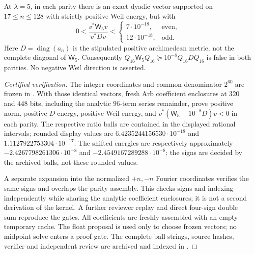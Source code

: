 \begin{proposition}
\label{prop:v152-tail-comparison}
At $\lambda=5$, in each parity there is an exact dyadic vector supported
on $17\le n\le128$ with strictly positive Weil energy, but with
\[
 0<\frac{v^*\mathsf W_5v}{v^*Dv}
 <\begin{cases}7\cdot10^{-18},&\text{even},\\
               12\cdot10^{-18},&\text{odd}.
   \end{cases}
\]
Here $D=\operatorname{diag}(a_n)$ is the stipulated positive
archimedean metric, not the complete diagonal of $\mathsf W_5$.
Consequently $Q_{16}\mathsf W_5Q_{16}\succeq10^{-8}Q_{16}DQ_{16}$
is false in both parities. No negative Weil direction is asserted.
\end{proposition}
\begin{proof}[Certified verification]
The integer coordinates and common denominator $2^{60}$ are frozen in
. With those identical
vectors, fresh Arb coefficient enclosures at $320$ and $448$ bits,
including the analytic $96$-term series remainder, prove positive norm,
positive $D$ energy, positive Weil energy, and
$v^*(\mathsf W_5-10^{-8}D)v<0$ in each parity.
The respective ratio balls are contained in the displayed rational
intervals; rounded display values are
$6.4235244156530\cdot10^{-18}$ and
$1.1127922753304\cdot10^{-17}$.
The shifted energies are respectively approximately
$-2.4267798261306\cdot10^{-8}$ and
$-2.4549167289288\cdot10^{-8}$; the signs are decided by the
archived balls, not these rounded values.

A separate expansion into the normalized $+n,-n$ Fourier coordinates
verifies the same signs and overlaps the parity assembly. This checks
signs and indexing independently while sharing the analytic coefficient
enclosures; it is not a second derivation of the kernel. A further
reviewer replay and direct four-sign double sum reproduce the gates.
All coefficients are freshly assembled with an empty temporary cache.
The float proposal is used only to choose frozen vectors; no midpoint
solve enters a proof gate. The complete ball strings, source hashes,
verifier and independent review are archived and indexed in
.
\end{proof}

